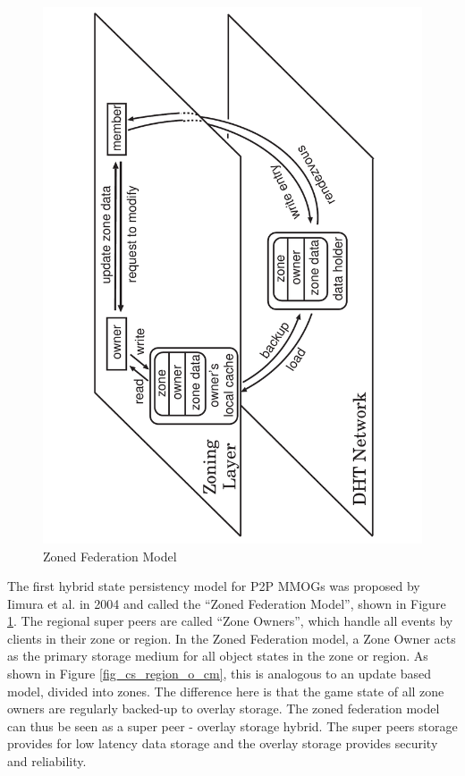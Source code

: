 \documentclass[10pt,a4paper,journal,cspaper,compsoc]{IEEEtran}
\begin{document}
\begin{figure}[htbp]
 \centering
 \includegraphics[clip=true, viewport=2cm 0cm 19cm 30cm, angle=-90, width=\columnwidth]{zoned_federation_model}
 \caption{Zoned Federation Model \cite{zoned_federation}}
 \label{fig_zoned_federation_model}
\end{figure}
%
The first hybrid state persistency model for P2P MMOGs was proposed by Iimura et al. in 2004 \cite{zoned_federation} and called the ``Zoned
Federation Model'', shown in Figure \ref{fig_zoned_federation_model}. The regional super peers are called ``Zone Owners'', which handle all events by
clients in their zone or region. In the Zoned Federation model, a Zone Owner acts as the primary storage medium for all object states in the zone or
region. As shown in Figure \ref{fig_cs_region_o_cm}, this is analogous to an update based model, divided into zones. The difference here is that the
game state of all zone owners are regularly backed-up to overlay storage. The zoned federation model can thus be seen as a super peer - overlay
storage hybrid. The super peers storage provides for low latency data storage and the overlay storage provides security and reliability.
\end{document}
